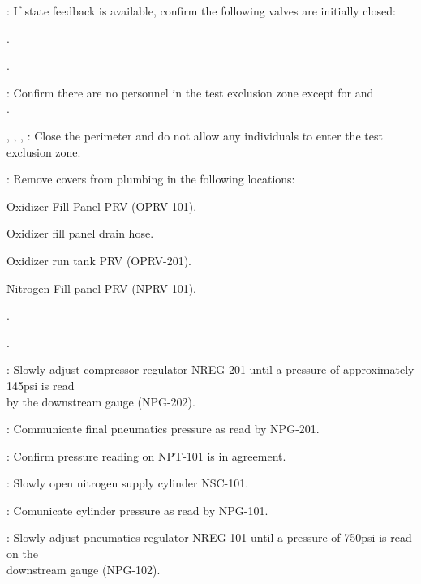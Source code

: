 \begin{checklist}
\begin{checklist}
    \end{checklist}
    \item \daq{}: If state feedback is available, confirm the following valves are initially closed:
    \begin{checklist}
        \item \finj{}.
        \item \oxinj{}.
    \end{checklist}
    \item \secondary{}: Confirm there are no personnel in the test exclusion zone except for \primary{} and \\ \phantom{} \hspace{3ex} \secondary{}.
    \item \peri{}, \perii{}, \periii{}, \periv{}: Close the perimeter and do not allow any individuals to enter the test exclusion zone.
    \item \primary{}: Remove covers from plumbing in the following locations:
    \begin{checklist}
        \item Oxidizer Fill Panel PRV (OPRV-101).
        \item Oxidizer fill panel drain hose.
        \item Oxidizer run tank PRV (OPRV-201).
        \item Nitrogen Fill panel PRV (NPRV-101).
        \item \vent{}.
        \item \fdrain{}.
        \item \pdrain{}
    \end{checklist}
    \item \primary{}: Slowly adjust compressor regulator NREG-201 until a pressure of approximately 145psi is read \\ \phantom{} \hspace{3ex} by the downstream gauge (NPG-202). 
    \item \primary{}: Communicate final pneumatics pressure as read by NPG-201.
    \item \daq{}: Confirm pressure reading on NPT-101 is in agreement. 
    \item \primary{}: Slowly open nitrogen supply cylinder NSC-101.
    \item \primary{}: Comunicate cylinder pressure as read by NPG-101.
    \item \primary{}: Slowly adjust pneumatics regulator NREG-101 until a pressure of 750psi is read on the \\ \phantom{} \hspace{3ex} downstream gauge (NPG-102).

\end{checklist}
